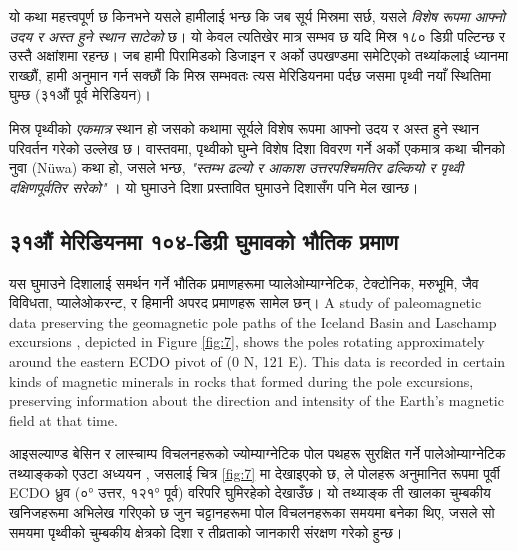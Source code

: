 \documentclass[10pt,twocolumn,letterpaper]{article}
\begin{document}
यो कथा महत्त्वपूर्ण छ किनभने यसले हामीलाई भन्छ कि जब सूर्य मिस्रमा सर्छ, यसले \textit{विशेष रूपमा आफ्नो उदय र अस्त हुने स्थान साटेको} छ। यो केवल त्यतिखेर मात्र सम्भव छ यदि मिस्र १८० डिग्री पल्टिन्छ र उस्तै अक्षांशमा रहन्छ। जब हामी पिरामिडको डिजाइन र अर्को उपखण्डमा समेटिएको तथ्यांकलाई ध्यानमा राख्छौं, हामी अनुमान गर्न सक्छौं कि मिस्र सम्भवतः त्यस मेरिडियनमा पर्दछ जसमा पृथ्वी नयाँ स्थितिमा घुम्छ (३१औं पूर्व मेरिडियन)।

मिस्र पृथ्वीको \textit{एकमात्र} स्थान हो जसको कथामा सूर्यले विशेष रूपमा आफ्नो उदय र अस्त हुने स्थान परिवर्तन गरेको उल्लेख छ। वास्तवमा, पृथ्वीको घुम्ने विशेष दिशा विवरण गर्ने अर्को एकमात्र कथा चीनको नुवा (Nüwa) कथा हो, जसले भन्छ, \textit{"स्तम्भ ढल्यो र आकाश उत्तरपश्चिमतिर ढल्कियो र पृथ्वी दक्षिणपूर्वतिर सरेको"} \cite{8}। यो घुमाउने दिशा प्रस्तावित घुमाउने दिशासँग पनि मेल खान्छ।

\subsection{३१औं मेरिडियनमा १०४-डिग्री घुमावको भौतिक प्रमाण}

यस घुमाउने दिशालाई समर्थन गर्ने भौतिक प्रमाणहरूमा प्यालेओम्याग्नेटिक, टेक्टोनिक, मरुभूमि, जैव विविधता, प्यालेओकरन्ट, र हिमानी अपरद प्रमाणहरू सामेल छन्।
A study of paleomagnetic data preserving the geomagnetic pole paths of the Iceland Basin and Laschamp excursions \cite{35}, depicted in Figure \ref{fig:7}, shows the poles rotating approximately around the eastern ECDO pivot of (0 N, 121 E). This data is recorded in certain kinds of magnetic minerals in rocks that formed during the pole excursions, preserving information about the direction and intensity of the Earth's magnetic field at that time.

आइसल्याण्ड बेसिन र लास्चाम्प विचलनहरूको ज्योम्याग्नेटिक पोल पथहरू सुरक्षित गर्ने पालेओम्याग्नेटिक तथ्याङ्कको एउटा अध्ययन \cite{35}, जसलाई चित्र \ref{fig:7} मा देखाइएको छ, ले पोलहरू अनुमानित रूपमा पूर्वी ECDO ध्रुव (०° उत्तर, १२१° पूर्व) वरिपरि घुमिरहेको देखाउँछ। यो तथ्याङ्क ती खालका चुम्बकीय खनिजहरूमा अभिलेख गरिएको छ जुन चट्टानहरूमा पोल विचलनहरूका समयमा बनेका थिए, जसले सो समयमा पृथ्वीको चुम्बकीय क्षेत्रको दिशा र तीव्रताको जानकारी संरक्षण गरेको हुन्छ।
\end{document}
